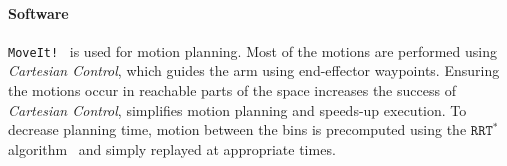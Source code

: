 
\paragraph{Software}
{\tt MoveIt!}~\cite{chitta2012moveit} is used for motion planning. Most of the motions are performed using \textit{Cartesian Control}, which guides the arm using end-effector waypoints. Ensuring the motions occur in reachable parts of the space increases the success of \textit{Cartesian Control}, simplifies motion planning and speeds-up execution. To decrease planning time, motion between the bins is precomputed using the $\mathtt{RRT^*}$ algorithm~\cite{Karaman2011Sampling-based-} and simply replayed at appropriate times. 


